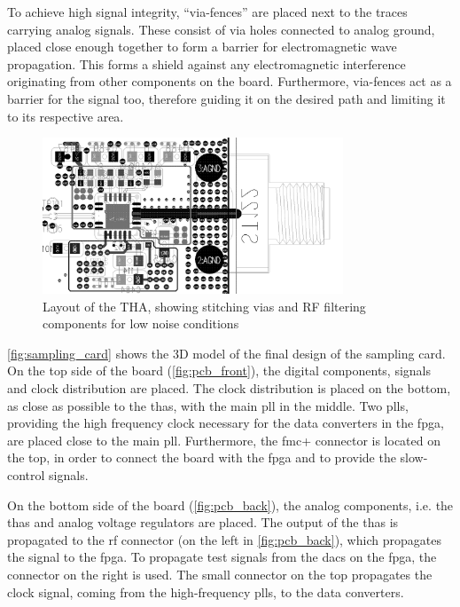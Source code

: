 To achieve high signal integrity, ``via-fences'' are placed next to the traces carrying analog signals. 
These consist of via holes connected to analog ground, placed close enough together to form a barrier for electromagnetic wave propagation. 
This forms a shield against any electromagnetic interference originating from other components on the board.
Furthermore, via-fences act as a barrier for the signal too, therefore guiding it on the desired path and limiting it to its respective area.
 \begin{figure}[tb]
 	\centering
 	\includegraphics[width = 0.8\textwidth]{chap/04-theresa/img/pcb/tha_pcb}
 	\caption[THA layout]{Layout of the THA, showing stitching vias and RF filtering components for low noise conditions}
 	\label{fig:stitch}
 \end{figure}

\autoref{fig:sampling_card} shows the 3D model of the final design of the sampling card.
On the top side of the board (\autoref{fig:pcb_front}), the digital components, signals and clock distribution are placed. 
The clock distribution is placed on the bottom, as close as possible to the \glspl{tha}, with the main \gls{pll} in the middle.
Two \glspl{pll}, providing the high frequency clock necessary for the data converters in the \gls{fpga}, are placed close to the main \gls{pll}.
Furthermore, the \gls{fmc}+ connector is located on the top, in order to connect the board with the \gls{fpga} and to provide the slow-control signals.

On the bottom side of the board (\autoref{fig:pcb_back}), the analog components, i.e. the \glspl{tha} and analog voltage regulators are placed. 
The output of the \glspl{tha} is propagated to the \gls{rf} connector (on the left in \autoref{fig:pcb_back}), which propagates the signal to the \gls{fpga}. 
To propagate test signals from the \glspl{dac} on the \gls{fpga}, the connector on the right is used.
The small connector on the top propagates the clock signal, coming from the high-frequency \glspl{pll}, to the data converters.

